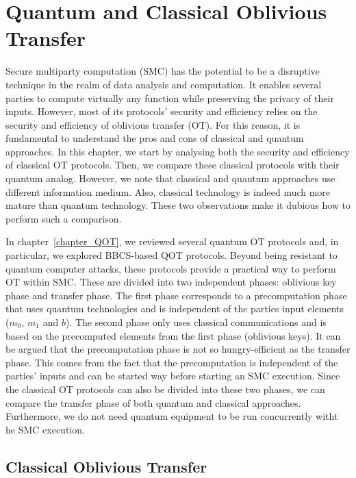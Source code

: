 


%

\chapter{Quantum and Classical Oblivious Transfer}

Secure multiparty computation (SMC) has the potential to be a disruptive technique in the realm of data analysis and computation. It enables several parties to compute virtually any function while preserving the privacy of their inputs. However, most of its protocols’ security and efficiency relies on the security and efficiency of oblivious transfer (OT). For this reason, it is fundamental to understand the pros and cons of classical and quantum approaches. In this chapter, we start by analysing both the security and efficiency of classical OT protocols. Then, we compare these classical protocols with their quantum analog. However, we note that classical and quantum approaches use different information medium. Also, classical technology is indeed much more mature than quantum technology. These two observations make it dubious how to perform such a comparison. 

In chapter~\ref{chapter_QOT}, we reviewed several quantum OT protocols and, in particular, we explored BBCS-based QOT protocols. Beyond being resistant to quantum computer attacks, these protocols provide a practical way to perform OT within SMC. These are divided into two independent phases: oblivious key phase and transfer phase. The first phase corresponds to a precomputation phase that uses quantum technologies and is independent of the parties input elements ($m_0$, $m_1$ and $b$). The second phase only uses classical communications and is based on the precomputed elements from the first phase (oblivious keys). It can be argued that the precomputation phase is not so hungry-efficient as the transfer phase. This comes from the fact that the precomputation is independent of the parties' inputs and can be started way before starting an SMC execution. Since the classical OT protocols can also be divided into these two phases, we can compare the transfer phase of both quantum and classical approaches. Furthermore, we do not need quantum equipment to be run concurrently witht he SMC execution.




\section{Classical Oblivious Transfer}



